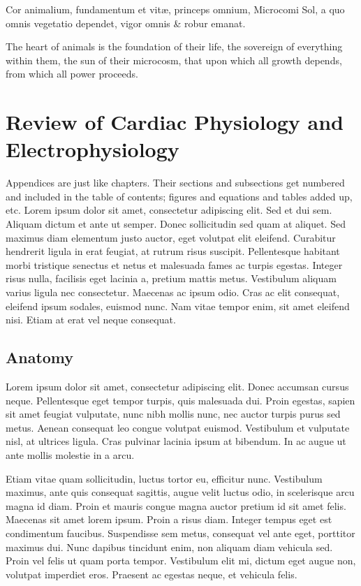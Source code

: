 \begin{savequote}[8cm]
\textlatin{Cor animalium, fundamentum e\longs t vitæ, princeps omnium, Microco\longs mi Sol, a quo omnis vegetatio dependet, vigor omnis \& robur emanat.}

The heart of animals is the foundation of their life, the sovereign of everything within them, the sun of their microcosm, that upon which all growth depends, from which all power proceeds.
\end{savequote}

\chapter{\label{app:1-cardiophys}Review of Cardiac Physiology and Electrophysiology}

\minitoc

Appendices are just like chapters.  Their sections and subsections get numbered and included in the table of contents; figures and equations and tables added up, etc.  Lorem ipsum dolor sit amet, consectetur adipiscing elit. Sed et dui sem. Aliquam dictum et ante ut semper. Donec sollicitudin sed quam at aliquet. Sed maximus diam elementum justo auctor, eget volutpat elit eleifend. Curabitur hendrerit ligula in erat feugiat, at rutrum risus suscipit. Pellentesque habitant morbi tristique senectus et netus et malesuada fames ac turpis egestas. Integer risus nulla, facilisis eget lacinia a, pretium mattis metus. Vestibulum aliquam varius ligula nec consectetur. Maecenas ac ipsum odio. Cras ac elit consequat, eleifend ipsum sodales, euismod nunc. Nam vitae tempor enim, sit amet eleifend nisi. Etiam at erat vel neque consequat.

\section{Anatomy}
\label{sec:anatomy}

Lorem ipsum dolor sit amet, consectetur adipiscing elit. Donec accumsan cursus neque. Pellentesque eget tempor turpis, quis malesuada dui. Proin egestas, sapien sit amet feugiat vulputate, nunc nibh mollis nunc, nec auctor turpis purus sed metus. Aenean consequat leo congue volutpat euismod. Vestibulum et vulputate nisl, at ultrices ligula. Cras pulvinar lacinia ipsum at bibendum. In ac augue ut ante mollis molestie in a arcu.

Etiam vitae quam sollicitudin, luctus tortor eu, efficitur nunc. Vestibulum maximus, ante quis consequat sagittis, augue velit luctus odio, in scelerisque arcu magna id diam. Proin et mauris congue magna auctor pretium id sit amet felis. Maecenas sit amet lorem ipsum. Proin a risus diam. Integer tempus eget est condimentum faucibus. Suspendisse sem metus, consequat vel ante eget, porttitor maximus dui. Nunc dapibus tincidunt enim, non aliquam diam vehicula sed. Proin vel felis ut quam porta tempor. Vestibulum elit mi, dictum eget augue non, volutpat imperdiet eros. Praesent ac egestas neque, et vehicula felis.

